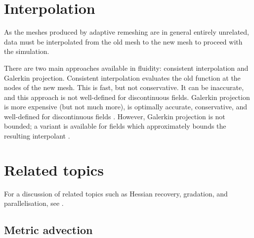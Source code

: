 \section{Interpolation} \label{sec:interpolation}
As the meshes produced by adaptive remeshing are in general entirely
unrelated, data must be interpolated from the old mesh to the new mesh
to proceed with the simulation.

There are two main approaches available in fluidity: consistent interpolation
and Galerkin projection. Consistent interpolation evaluates the old function
at the nodes of the new mesh. This is fast, but not conservative. It can be inaccurate,
and this approach is not well-defined for discontinuous fields.
Galerkin projection is more expensive (but not much more), is optimally accurate,
conservative, and well-defined for discontinuous fields \citep{farrell2009i}.
However, Galerkin projection is not bounded; a variant is available for \Pone fields
which approximately bounds the resulting interpolant \citep{farrell2009a}.

\section{Related topics} \label{sec:adaptivity_related_topics}
For a discussion of related topics such as Hessian recovery, gradation, and parallelisation,
see \citep{farrell2009i}.

\subsection{Metric advection}
\label{sect:adaptivity_metric_advection}
